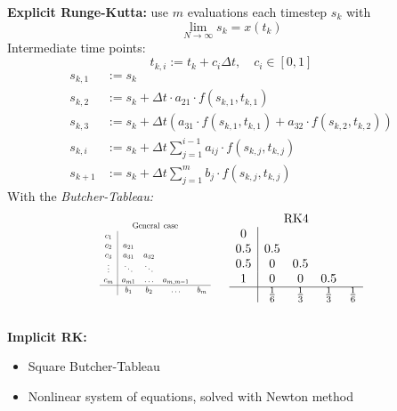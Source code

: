 \begin{tcolorbox}[colback=green!5!white,
  colframe=green!75!black,
  title=\textbf{Numerical integration/simulation}]
  \textbf{Explicit Runge-Kutta:} use $m$ evaluations each timestep $s_k$ with
  \[\lim_{N\rightarrow\infty}s_k=x(t_k)\]
  Intermediate time points:
  \[t_{k,i}:= t_k + c_i\Delta t,\quad c_i\in [0,1]\]
  \begin{align*}
    s_{k, 1} &:= s_k \\
    s_{k, 2} &:= s_k + \Delta t\cdot a_{21}\cdot f(s_{k,1}, t_{k,1}) \\
    s_{k, 3} &:= s_k + \Delta t(a_{31}\cdot f(s_{k,1}, t_{k,1}) + a_{32}\cdot f(s_{k,2}, t_{k,2}))\\
    s_{k, i} &:= s_k + \Delta t\sum^{i-1}_{j=1}a_{ij}\cdot f(s_{k,j}, t_{k,j}) \\
    s_{k+1} &:= s_k + \Delta t \sum^m_{j=1}b_j\cdot f(s_{k,j}, t_{k,j})
  \end{align*}
  With the \emph{Butcher-Tableau:}
  \begin{equation*}
    \resizebox{!}{11mm}{$
      \begin{array}{c|cccc}
        \multicolumn{5}{c}{\mathrm{{\Large General\ case}}}\\
      c_1&&&& \\
      c_2&a_{21}&&& \\
      c_3&a_{31}&a_{32}&& \\
      \vdots & \ddots & \ddots&& \\
      c_m & a_{m1} & \dots & a_{m,m-1} & \\ \hline
      & b_1 & b_2 & \dots & b_m
    \end{array}
    $}
  \hspace{15pt}
  \begin{array}{c|cccc}
    \multicolumn{5}{c}{\mathrm{RK4}}\\
      0&&&& \\
      0.5&0.5&&& \\
      0.5&0&0.5&& \\
      1 & 0 & 0 & 0.5 & \\ \hline
      & \frac{1}{6} & \frac{1}{3} & \frac{1}{3} & \frac{1}{6}
    \end{array}
  \end{equation*}\\

  \textbf{Implicit RK:}
  \begin{itemize}
  \item Square Butcher-Tableau
  \item Nonlinear system of equations, solved with Newton method\\
  \end{itemize}


\end{tcolorbox}
